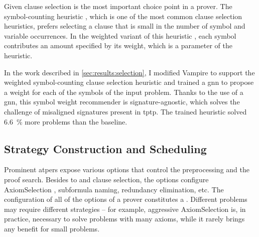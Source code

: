 Given clause selection is the most important choice point in a prover.
The symbol-counting heuristic \cite{DBLP:conf/cade/SchulzM16}, which is one of the most common clause selection heuristics,
prefers selecting a clause that is small in the number of symbol and variable occurrences.
In the weighted variant of this heuristic \cite{E-manual},
each symbol contributes an amount specified by its weight,
which is a parameter of the heuristic.

In the work described in \cref{sec:results:selection},
I modified Vampire to support the weighted symbol-counting clause selection heuristic
and trained a \gls{gnn} to propose a weight for each of the symbols of the input problem.
Thanks to the use of a \gls{gnn}, this symbol weight recommender is signature-agnostic,
which solves the challenge of misaligned signatures present in \gls{tptp}.
The trained heuristic solved \SI{6.6}{\percent} more problems than the baseline.


\subsection{Strategy Construction and Scheduling}

Prominent \glspl{atper} expose various options that control the preprocessing and the proof search.
Besides \gls{to} and clause selection,
the options configure \gls{AxiomSelection} \cite{DBLP:conf/cade/HoderV11}, subformula naming, redundancy elimination, etc.
The configuration of all of the options of a prover constitutes a .
Different problems may require different strategies -- for example, aggressive \gls{AxiomSelection} is, in practice, necessary to solve problems with many axioms, while it rarely brings any benefit for small problems.

